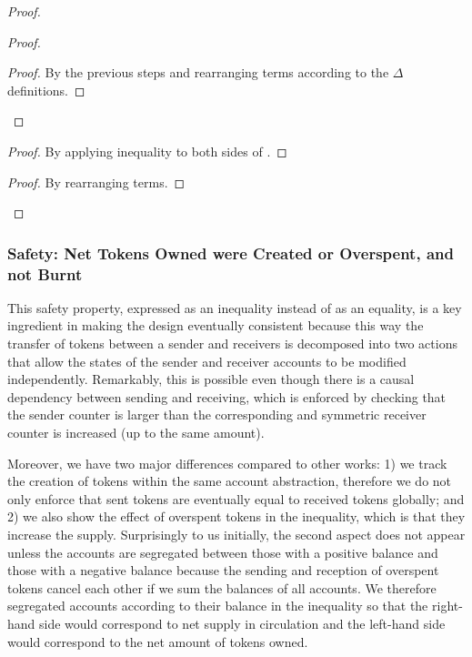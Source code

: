 \documentclass[9pt]{article}   	%
\begin{document}
\begin{proof}
\begin{proof}
		\qedstep
		\begin{proof}
			By the previous steps and rearranging terms according to the $\Delta$ definitions.
		\end{proof}                      
	\end{proof}

	\begin{proof}
		By applying inequality to both sides of .
	\end{proof}
	
	\qedstep
	\begin{proof}
		By rearranging terms.	
	\end{proof}
\end{proof}

\subsubsection{Safety: Net Tokens Owned were Created or Overspent, and not Burnt}
\label{sec:proof:balance-safety}

This safety property, expressed as an inequality instead of as an equality, is a key ingredient in making the design eventually consistent because this way the transfer of tokens between a sender and receivers is decomposed into two actions that allow the states of the sender and receiver accounts to be modified independently. Remarkably, this is possible even though there is a causal dependency between sending and receiving, which is enforced by checking that the sender counter is larger than the corresponding and symmetric receiver counter is increased (up to the same amount).

Moreover, we have two major differences compared to other works: 1) we track the creation of tokens within the same account abstraction, therefore we do not only enforce that sent tokens are eventually equal to received tokens globally; and 2) we also show the effect of overspent tokens in the inequality, which is that they increase the supply.  Surprisingly to us initially, the second aspect does not appear unless the accounts are segregated between those with a positive balance and those with a negative balance because the sending and reception of overspent tokens cancel each other if we sum the balances of all accounts. We therefore segregated accounts according to their balance in the inequality so that the right-hand side would correspond to net supply in circulation and the left-hand side would correspond to the net amount of tokens owned.
\end{document}
